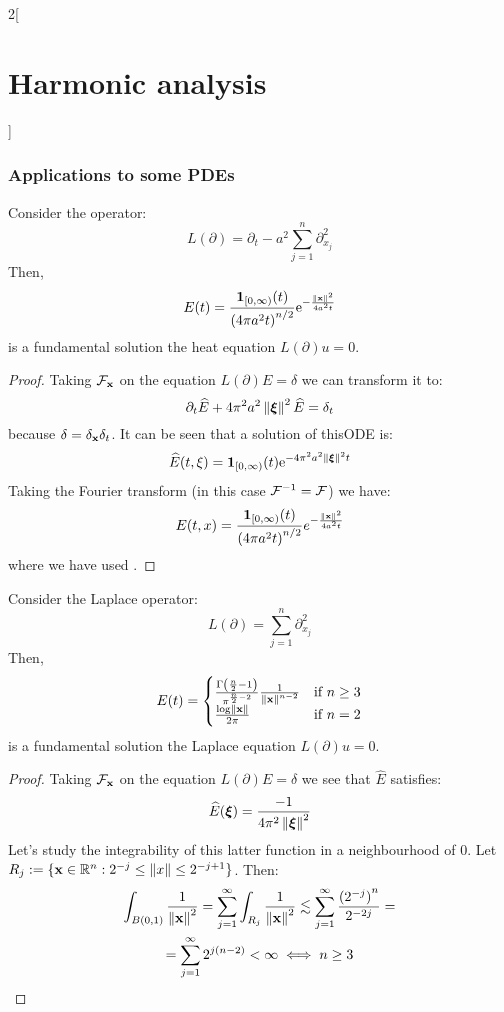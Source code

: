 \documentclass[../../../main_math.tex]{subfiles}
\begin{document}
\begin{multicols}{2}[\section{Harmonic analysis}]
  \subsubsection{Applications to some PDEs}
  \begin{proposition}\label{HA:heat}
    Consider the operator:
    $$
      L(\partial)=\partial_t-a^2\sum_{j=1}^{n}\partial_{x_j}^2
    $$
    Then, $$
      E(t)=\frac{\boldsymbol{\mathrm{1}}_{[0,\infty)}(t)}{{(4\pi a^2t)}^{n/2}}\mathrm{e}^{-\frac{\left\|\boldsymbol{\mathrm{x}}\right\|^2}{4a^2t}}
    $$
    is a fundamental solution the heat equation $L(\partial)u=0$.
  \end{proposition}
  \begin{proof}
    Taking $\mathcal{F}_{\boldsymbol{\mathrm{x}}}$ on the equation $L(\partial) E=\delta$ we can transform it to:
    $$
      \partial_t \widehat{E}+4\pi^2a^2\left\|\boldsymbol{\mathrm{\xi}}\right\|^2\widehat{E}=\delta_t
    $$
    because $\delta=\delta_{\boldsymbol{\mathrm{x}}}\delta_t$. It can be seen that a solution of thisODE is:
    $$
      \widehat{E}(t,\xi)=\boldsymbol{\mathrm{1}}_{[0,\infty)}(t)\mathrm{e}^{-4\pi^2a^2\left\|\boldsymbol{\mathrm{\xi}}\right\|^2t}
    $$
    Taking the Fourier transform (in this case $\mathcal{F}^{-1}=\mathcal{F}$) we have:
    $$
      E(t,x)=\frac{\boldsymbol{\mathrm{1}}_{[0,\infty)}(t)}{{(4\pi a^2t)}^{n/2}}e^{-\frac{\left\|\boldsymbol{\mathrm{x}}\right\|^2}{4a^2t}}
    $$
    where we have used .
  \end{proof}
  \begin{proposition}
    Consider the Laplace operator:
    $$
      L(\partial)=\sum_{j=1}^{n}\partial_{x_j}^2
    $$
    Then, $$
      E(t)=\begin{cases}
        \frac{\Gamma\left(\frac{n}{2}-1\right)}{\pi^{\frac{n}{2}-2}}\frac{1}{\left\|\boldsymbol{\mathrm{x}}\right\|^{n-2}} & \text{if }n\geq 3 \\
        \frac{\log\left\|\boldsymbol{\mathrm{x}}\right\|}{2\pi}                                                            & \text{if }n=2     \\
      \end{cases}
    $$
    is a fundamental solution the Laplace equation $L(\partial)u=0$.
  \end{proposition}
  \begin{proof}
    Taking $\mathcal{F}_{\boldsymbol{\mathrm{x}}}$ on the equation $L(\partial) E=\delta$ we see that $\widehat{E}$ satisfies:
    $$
      \widehat{E}(\boldsymbol{\mathrm{\xi}}) = \frac{-1}{4\pi^2\left\|\boldsymbol{\mathrm{\xi}}\right\|^2}
    $$
    Let's study the integrability of this latter function in a neighbourhood of $0$. Let $R_j:=\{\boldsymbol{\mathrm{x}}\in\mathbb{R}^n:2^{-j}\leq \left\|x\right\|\leq 2^{-j+1}\}$. Then:
    \begin{multline*}
      \int_{B(0,1)}\frac{1}{\norm{\vf{x}}^2}=\sum_{j=1}^{\infty}\int_{R_j} \frac{1}{\norm{\vf{x}}^2}\lesssim \sum_{j=1}^{\infty}\frac{{(2^{-j})}^n}{2^{-2j}}=\\= \sum_{j=1}^{\infty}2^{j(n-2)}<\infty\iff n\geq 3

\end{multline*}
\end{proof}
\end{multicols}
\end{document}
